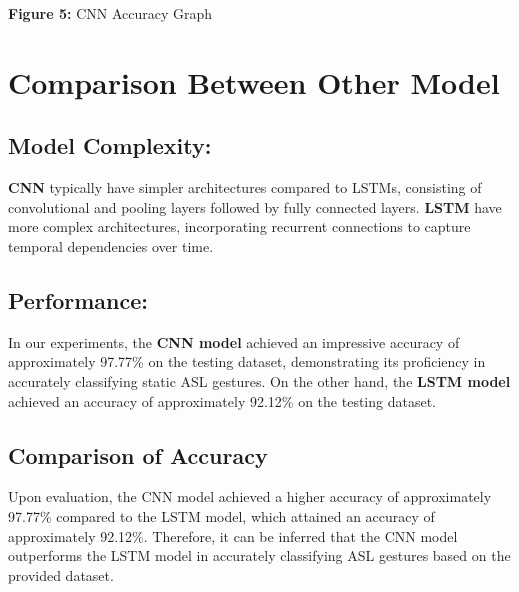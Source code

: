 \documentclass[conference]{IEEEtran}
\begin{document}
\vspace{\baselineskip}

\begin{center}

  \textbf{Figure 5:} CNN Accuracy Graph
\end{center}

\vspace{\baselineskip}

\section{Comparison Between Other Model}

\vspace{\baselineskip}

\subsection{Model Complexity:}

\textbf{CNN} typically have simpler architectures compared to LSTMs, consisting of convolutional and pooling layers followed by fully connected layers.
\textbf{LSTM} have more complex architectures, incorporating recurrent connections to capture temporal dependencies over time.


\subsection{Performance:}


In our experiments, the \textbf{CNN model} achieved an impressive accuracy of approximately 97.77\% on the testing dataset, demonstrating its proficiency in accurately classifying static ASL gestures.
On the other hand, the \textbf{LSTM model} achieved an accuracy of approximately 92.12\% on the testing dataset.

\vspace{\baselineskip}

\subsection{Comparison of Accuracy}

Upon evaluation, the CNN model achieved a higher accuracy of approximately 97.77\% compared to the LSTM model, which attained an accuracy of approximately 92.12\%. Therefore, it can be inferred that the CNN model outperforms the LSTM model in accurately classifying ASL gestures based on the provided dataset.
\end{document}
